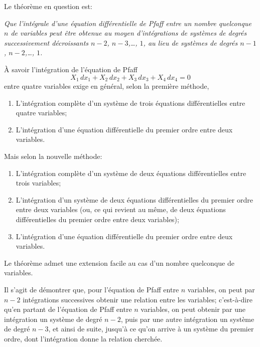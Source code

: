 \documentclass[11pt,a4paper]{article}
\theoremstyle{definition}
\begin{document}
Le th\'{e}or\`{e}me en question est:\medskip

\textit{Que l'int\'{e}grale d'une \'{e}quation diff\'{e}rentielle de Pfaff entre un nombre
quelconque $n$ de variables peut \^{e}tre obtenue au moyen d'int\'{e}grations de
syst\`{e}mes de degr\'{e}s successivement d\'{e}croissants $n-2$, $n-3$,\ldots, $1$, au
lieu de syst\`{e}mes de degr\'{e}s $n-1$, $n-2$,\ldots, $1$.}
\medskip

\`{A} savoir l'int\'{e}gration de l'\'{e}quation de Pfaff
\[X_{1}\,dx_{1} + X_{2}\,dx_{2} + X_{3}\,dx_{3} + X_{4}\,dx_{4} = 0\]
entre quatre variables exige en g\'{e}n\'{e}ral, selon la premi\`{e}re m\'{e}thode,

\begin{enumerate}[label=\arabic*.]
\item L'int\'{e}gration compl\`{e}te d'un syst\`{e}me de trois \'{e}quations diff\'{e}rentielles
entre quatre variables;
\item L'int\'{e}gration d'une \'{e}quation diff\'{e}rentielle du premier ordre entre deux variables.
\end{enumerate}

Mais selon la nouvelle m\'{e}thode:
\begin{enumerate}[label=\arabic*.]
\item L'int\'{e}gration compl\`{e}te d'un syst\`{e}me de deux \'{e}quations diff\'{e}rentielles
entre trois variables;
\item L'int\'{e}gration d'un syst\`{e}me de deux \'{e}quations diff\'{e}rentielles du premier
ordre entre deux variables (ou, ce qui revient au m\^{e}me, de deux \'{e}quations
diff\'{e}rentielles du premier ordre entre deux variables);
\item L'int\'{e}gration d'une \'{e}quation diff\'{e}rentielle du premier ordre entre deux variables.
\end{enumerate}

Le th\'{e}or\`{e}me admet une extension facile au cas d'un nombre quelconque de variables.

Il s'agit de d\'{e}montrer que, pour l'\'{e}quation de Pfaff entre $n$ variables, on peut
par $n-2$ int\'{e}grations successives obtenir une relation entre les variables; c'est-\`{a}-dire
qu'en partant de l'\'{e}quation de Pfaff entre $n$ variables, on peut obtenir par une
int\'{e}gration un syst\`{e}me de degr\'{e} $n-2$, puis par une autre int\'{e}gration un syst\`{e}me
de degr\'{e} $n-3$, et ainsi de suite, jusqu'\`{a} ce qu'on arrive \`{a} un syst\`{e}me du premier
ordre, dont l'int\'{e}gration donne la relation cherch\'{e}e.
\end{document}
